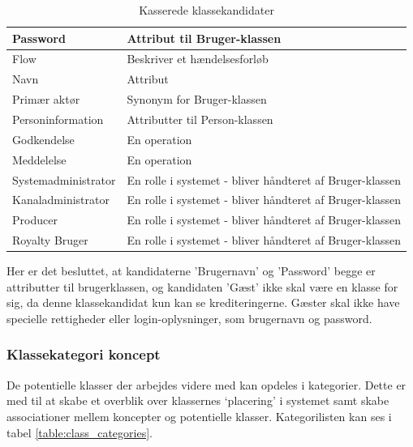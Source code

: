 \begin{table}[H]
\begin{tabularx}{\textwidth}{|>{\RaggedRight}X|>{\RaggedRight}X|}
        \hline
        Password & Attribut til Bruger-klassen\\
        \hline
        Flow & Beskriver et hændelsesforløb\\
        \hline
        Navn & Attribut \\
        \hline
        Primær aktør &  Synonym for Bruger-klassen\\
        \hline
        Personinformation &  Attributter til Person-klassen\\
        \hline
        Godkendelse & En operation \\
        \hline
        Meddelelse & En operation \\
        \hline
        Systemadministrator & En rolle i systemet - bliver håndteret af Bruger-klassen \\
        \hline
        Kanaladministrator & En rolle i systemet - bliver håndteret af Bruger-klassen \\
        \hline 
        Producer & En rolle i systemet - bliver håndteret af Bruger-klassen \\
        \hline
        Royalty Bruger & En rolle i systemet - bliver håndteret af Bruger-klassen \\
        \hline
    \end{tabularx}
    \caption{Kasserede klassekandidater}
    \label{table:deleted_class_candidates}
\end{table}


Her er det besluttet, at kandidaterne 'Brugernavn' og 'Password' begge er attributter til brugerklassen, og kandidaten 'Gæst' ikke skal være en klasse for sig, da denne klassekandidat kun kan se krediteringerne. Gæster skal ikke have specielle rettigheder eller login-oplysninger, som brugernavn og password.


\subsubsection{Klassekategori koncept}
De potentielle klasser der arbejdes videre med kan opdeles i kategorier. Dette er med til at skabe et overblik over klassernes ‘placering’ i systemet samt skabe associationer mellem koncepter og potentielle klasser.
Kategorilisten kan ses i tabel \ref{table:class_categories}.

